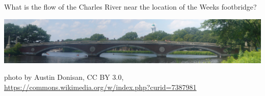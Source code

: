 \documentclass[12pt,letterpaper,noanswers]{exam}
\begin{document}
 \pdfpageheight 11in 
  \pdfpagewidth 8.5in
\vspace{0.5cm}



\noindent What is the flow of the Charles River near the location of the Weeks footbridge?


\noindent\includegraphics[width=\textwidth]{img/Weeks_footbridge_panorama.jpg}



\noindent photo by Austin Donisan, CC BY 3.0, \url{https://commons.wikimedia.org/w/index.php?curid=7387981}
\end{document}
